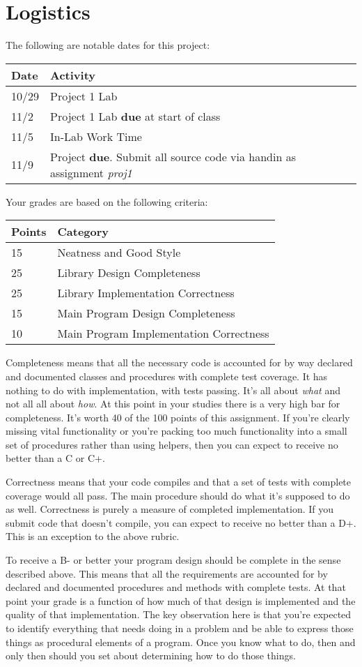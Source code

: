 \documentclass[10pt]{article}
\begin{document}
\section{Logistics}

The following are notable dates for this project:
\begin{center}
\begin{tabular}{ll}
Date & Activity \\ \hline
10/29 & Project 1 Lab \\
11/2 & Project 1 Lab \textbf{due} at start of class \\
11/5 & In-Lab Work Time \\
11/9 & Project \textbf{due}. Submit all source code via handin as assignment \textit{proj1} 
\end{tabular}
\end{center}

Your grades are based on the following criteria:
\begin{center}
\begin{tabular}{ll}
Points & Category \\ \hline
15  & Neatness and Good Style \\
25  & Library Design Completeness \\
25  & Library Implementation Correctness \\
15  & Main Program Design Completeness \\
10  & Main Program Implementation Correctness     
\end{tabular}
\end{center}

Completeness means that all the necessary code is accounted for by way declared and documented classes and procedures with complete test coverage. It has nothing to do with implementation, with tests passing. It's all about \textit{what} and not all all about \textit{how}. At this point in your studies there is a very high bar for completeness.  It's worth 40 of the 100 points of this assignment. If you're clearly missing vital functionality or you're packing too much functionality into a small set of procedures rather than using helpers, then you can expect to receive no better than a C or C+. 

Correctness means that your code compiles and that a set of tests with complete coverage would all pass. The main procedure should do what it's supposed to do as well.  Correctness is purely a measure of completed implementation.  If you submit code that doesn't compile, you can expect to receive no better than a D+.  This is an exception to the above rubric. 

To receive a B- or better your program design should be complete in the sense described above. This means that all the requirements are accounted for by declared and documented procedures and methods with complete tests. At that point your grade is a function of how much of that design is implemented and the quality of that implementation. The key observation here is that you're expected to identify everything that needs doing in a problem and be able to express those things as procedural elements of a program.  Once you know what to do, then and only then should you set about determining how to do those things.    
\end{document}
